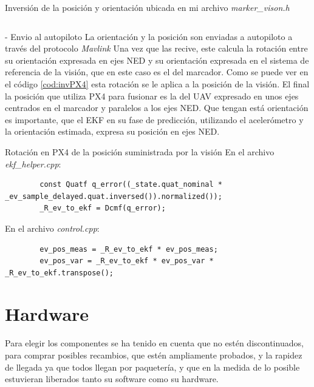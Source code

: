 	\figEjes

	\begin{codigo}{Inversión de la posición y orientación ubicada en mi archivo \textit{marker\_vison.h}}
	\label{cod:inver}
	\inputminted{c++}{posicionamiento_marcadores/cod_inver.cpp}
	\end{codigo} 

	
- Envio al autopiloto 
	La orientación y la posición son enviadas a autopiloto a través del protocolo \textit{Mavlink}
	Una vez que las recive, este calcula la rotación entre su orientación expresada en ejes NED y su orientación expresada en el sistema de referencia de la visión, que en este caso es el del marcador. Como se puede ver en el código \ref{cod:invPX4} esta rotación se le aplica a la posición de la visión. El final la posición que utiliza PX4 para fusionar es la del UAV expresado en unos ejes centrados en el marcador y paralelos a los ejes NED. Que tengan está orientación es importante, que el EKF en su fase de predicción, utilizando el acelerómetro y la orientación estimada, expresa su posición en ejes NED.

	\begin{codigo}{Rotación en PX4 de la posición suministrada por la visión}
	\label{cod:invPX4}
	En el archivo \textit{ekf\_helper.cpp}:
	\begin{verbatim}
		const Quatf q_error((_state.quat_nominal * _ev_sample_delayed.quat.inversed()).normalized());
		_R_ev_to_ekf = Dcmf(q_error);
	\end{verbatim}
	En el archivo \textit{control.cpp}:
	\begin{verbatim}
		ev_pos_meas = _R_ev_to_ekf * ev_pos_meas;
		ev_pos_var = _R_ev_to_ekf * ev_pos_var * _R_ev_to_ekf.transpose();
	\end{verbatim}
	\end{codigo} 



\section{Hardware}
Para elegir los componentes se ha tenido en cuenta que no estén discontinuados, para comprar posibles recambios, que estén ampliamente probados, y la rapidez de llegada ya que todos llegan por paquetería, y que en la medida de lo posible estuvieran liberados tanto su software como su hardware. 

